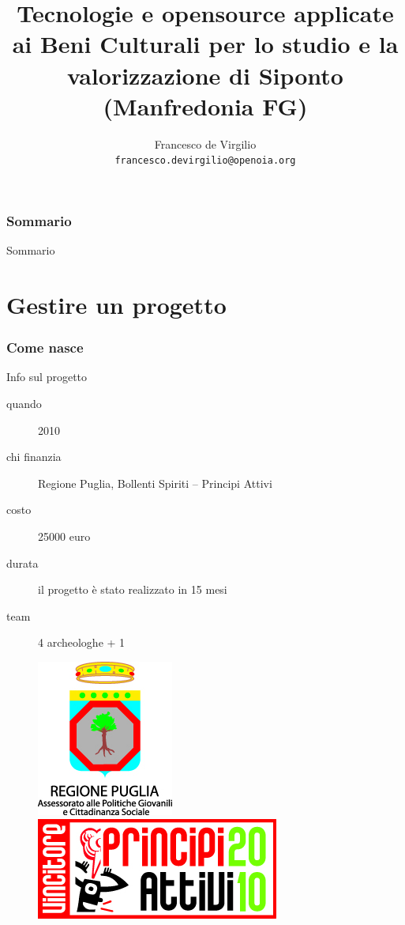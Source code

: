 \documentclass{beamer}
\title[Tecnologie e opensource per i BB.CC.: il caso di Siponto (FG))]{Tecnologie e opensource applicate ai Beni Culturali per lo studio e la valorizzazione di Siponto (Manfredonia FG)}
\author[Francesco de Virgilio]{Francesco de Virgilio \\ \texttt{\tiny francesco.devirgilio@openoia.org}}
\institute[O.I.A.~Open Idea for Archaeology]{
	OIA --- Open Idea for Archaeology%
	}
\begin{document}

\begin{frame}
	\titlepage
\end{frame}


\section*{Sommario}

	\begin{frame}{Sommario}
		\begin{multicols}{2}
			\tableofcontents
		\end{multicols}
	\end{frame}
	
\part{Gestire un progetto}
	\frame{\partpage}

	\section{Come nasce}

		\begin{frame}{Info sul progetto}
			\begin{description}
				\item[quando] 2010
				\item[chi finanzia] Regione Puglia, Bollenti Spiriti -- Principi Attivi
				\item[costo] 25000 euro
				\item[durata] il progetto è stato realizzato in 15 mesi
				\item[team] 4 archeologhe + 1
			\end{description}
			\vfill
			\begin{figure}[]
				\begin{center}
					\includegraphics[width=0.2\linewidth]{regione}\hfill
					\includegraphics[width=0.3\linewidth]{pa}
				\end{center}
				\label{fig:regione}
			\end{figure}
		\end{frame}
\end{document}
